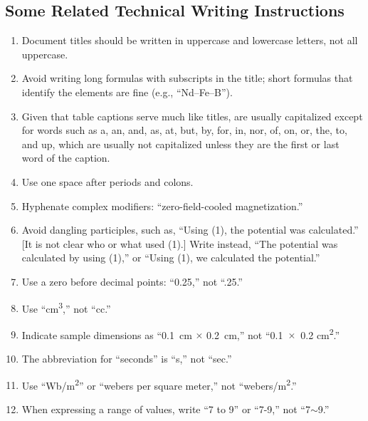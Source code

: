 \subsection{Some Related Technical Writing Instructions}

\begin{enumerate}
	\item Document titles should be written in uppercase and lowercase letters, not all uppercase.
	
	\item Avoid writing long formulas with subscripts in the title; short formulas that identify the elements are fine (e.g., ``Nd–Fe–B''). 
	
	\item Given that table captions serve much like titles, are usually capitalized except for words such as a, an, and, as, at, but, by, for, in, nor, of, on, or, the, to, and up, which are usually not capitalized unless they are the first or last word of the caption. 
	
	\item Use one space after periods and colons.
	
	\item Hyphenate complex modifiers: ``zero-field-cooled magnetization.'' 
	
	\item Avoid dangling participles, such as, ``Using (1), the potential was calculated.'' [It is not clear who or what used (1).] Write instead, ``The potential was calculated by using (1),'' or ``Using (1), we calculated the potential.'' 
	
	\item Use a zero before decimal points: ``0.25,'' not ``.25.'' 
	
	\item Use ``cm\textsuperscript{3},'' not ``cc.'' 
	
	\item Indicate sample dimensions as ``0.1~cm $\times$ 0.2~cm,'' not ``0.1~$\times$~0.2 cm\textsuperscript{2}.'' 
	
	\item The abbreviation for ``seconds'' is ``s,'' not ``sec.'' 
	
	\item Use ``Wb/m\textsuperscript{2}'' or ``webers per square meter,'' not ``webers/m\textsuperscript{2}.'' 
	
	\item When expressing a range of values, write ``7 to 9'' or ``7-9,'' not ``7$\sim$9.''


\end{enumerate}
